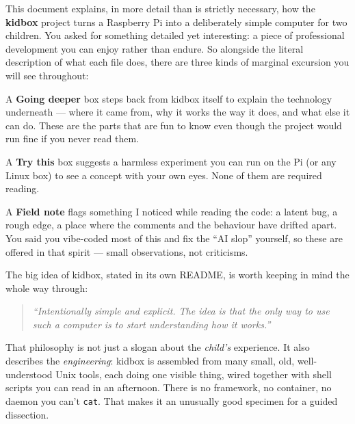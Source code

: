 \documentclass[11pt,oneside]{article}
\begin{document}
This document explains, in more detail than is strictly necessary, how the
\textbf{kidbox} project turns a Raspberry Pi into a deliberately simple
computer for two children. You asked for something detailed yet interesting:
a piece of professional development you can enjoy rather than endure. So
alongside the literal description of what each file does, there are three
kinds of marginal excursion you will see throughout:

\begin{deeper}
A \textbf{Going deeper} box steps back from kidbox itself to explain the
technology underneath --- where it came from, why it works the way it does,
and what else it can do. These are the parts that are fun to know even though
the project would run fine if you never read them.
\end{deeper}

\begin{tryit}
A \textbf{Try this} box suggests a harmless experiment you can run on the Pi
(or any Linux box) to see a concept with your own eyes. None of them are
required reading.
\end{tryit}

\begin{fieldnote}
A \textbf{Field note} flags something I noticed while reading the code: a
latent bug, a rough edge, a place where the comments and the behaviour have
drifted apart. You said you vibe-coded most of this and fix the ``AI slop''
yourself, so these are offered in that spirit --- small observations, not
criticisms.
\end{fieldnote}

The big idea of kidbox, stated in its own README, is worth keeping in mind the
whole way through:

\begin{quote}\itshape
``Intentionally simple and explicit. The idea is that the only way to use such
a computer is to start understanding how it works.''
\end{quote}

That philosophy is not just a slogan about the \emph{child's} experience. It
also describes the \emph{engineering}: kidbox is assembled from many small,
old, well-understood Unix tools, each doing one visible thing, wired together
with shell scripts you can read in an afternoon. There is no framework, no
container, no daemon you can't \texttt{cat}. That makes it an unusually good
specimen for a guided dissection.

\end{document}

